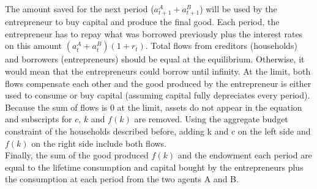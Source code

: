 \documentclass{article}
\begin{document}
The amount saved for the next period ($a_{t+1}^A+a_{t+1}^B$) will be used by the entrepreneur to buy capital and produce the final good. Each period, the entrepreneur has to repay what was borrowed previously plus the interest rates on this amount $(a_{t}^A+a_{t}^B)(1+r_t)$. Total flows from creditors (households) and borrowers (entrepreneurs) should be equal at the equilibrium. Otherwise, it would mean that the entrepreneurs could borrow until infinity. At the limit, both flows compensate each other and the good produced by the entrepreneur is either used to consume or buy capital (assuming capital fully depreciates every period). Because the sum of flows is 0 at the limit, assets do not appear in the equation and subscripts for $c$, $k$ and $f(k)$ are removed. Using the aggregate budget constraint of the households described before, adding k and c on the left side and $f(k)$ on the right side include both flows. \\

Finally, the sum of the good produced $f(k)$ and the endowment each period are equal to the lifetime consumption and capital bought by the entrepreneurs plus the consumption at each period from the two agents A and B.\\
\end{document}
